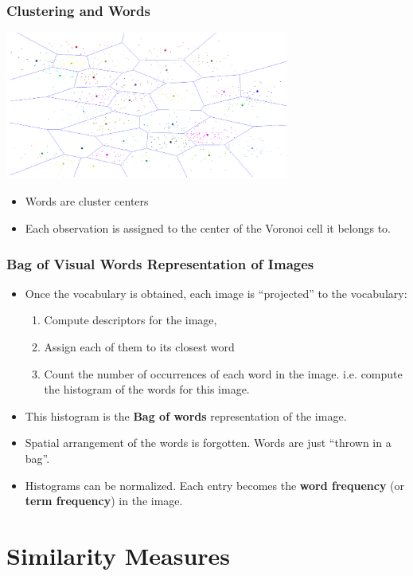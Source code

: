 \documentclass[10pt]{beamer}
\begin{document}
\begin{frame}
  \frametitle{Clustering and Words}
  \begin{center}
    \includegraphics[width=0.7\textwidth, height=0.5\textheight]{FIGURES/clustervoronoi}
  \end{center}
  \begin{itemize}
  \item Words are cluster centers
  \item Each observation is assigned to the center of the Voronoi cell it belongs to.
  \end{itemize}
\end{frame}



\begin{frame}
  \frametitle{Bag of Visual Words Representation of Images}
  \begin{itemize}
  \item Once the vocabulary is obtained, each image is ``projected'' to the vocabulary:
    \begin{enumerate}
    \item Compute descriptors for the image,
    \item Assign each of them to its closest word
    \item Count the number of occurrences of each word in the image. i.e.
      compute the histogram of the words for this image. 
    \end{enumerate}
  \item This histogram is the \textbf{Bag of words} representation of
    the image.
  \item Spatial arrangement of the words is forgotten. Words are just ``thrown in a bag''.
  \item Histograms can be normalized. Each entry becomes the
    \textbf{word frequency} (or \textbf{term frequency}) in the image.
  \end{itemize}
\end{frame}


\section{Similarity Measures}
\label{sec:simmeas}
\end{document}

